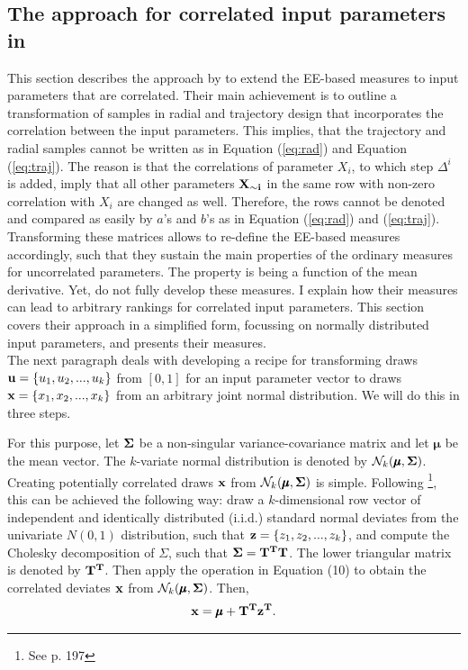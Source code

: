 \subsection{The approach for correlated input parameters in \cite{ge2017extending}}

This section describes the approach by \cite{ge2017extending} to extend the EE-based measures to input parameters that are correlated. Their main achievement is to outline a transformation of samples in radial and trajectory design that incorporates the correlation between the input parameters. This implies, that the trajectory and radial samples cannot be written as in Equation (\ref{eq:rad}) and Equation (\ref{eq:traj}). The reason is that the correlations of parameter $X_i$, to which step $\Delta^i$ is added, imply that all other parameters $\bold{X_{\sim i}}$ in the same row with non-zero correlation with $X_i$ are changed as well. Therefore, the rows cannot be denoted and compared as easily by $a$'s and $b$'s as in Equation (\ref{eq:rad}) and (\ref{eq:traj}). Transforming these matrices allows to re-define the EE-based measures accordingly, such that they sustain the main properties of the ordinary measures for uncorrelated parameters. The property is being a function of the mean derivative. Yet, \cite{ge2017extending} do not fully develop these measures. I explain how their measures can lead to arbitrary rankings for correlated input parameters. This section covers their approach in a simplified form, focussing on normally distributed input parameters, and presents their measures.\\

\noindent
The next paragraph deals with developing a recipe for transforming draws $\bold{u} = \{u_1, u_2, ..., u_k\}$ from $[0,1]$ for an input parameter vector to draws $\bold{x} = \{x_1, x_2, ..., x_k\}$ from an arbitrary joint normal distribution. We will do this in three steps. 

For this purpose, let $\bold{\Sigma}$ be a non-singular variance-covariance matrix and let $\pmb{\mu}$ be the mean vector. The $k$-variate normal distribution is denoted by $\mathcal{N}_k(\pmb{\mu}, \bold{\Sigma})$. \\

\noindent
Creating potentially correlated draws $\bold{x}$ from $\mathcal{N}_k(\pmb{\mu}, \bold{\Sigma})$ is simple. Following \cite{gentle2006random}\footnote{See p. 197}, this can be achieved the following way: draw a $k$-dimensional row vector of independent and identically distributed (i.i.d.) standard normal deviates from the univariate $N(0,1)$ distribution, such that  $\bold{z} = \{z_1, z_2, ..., z_k\}$, and compute the Cholesky decomposition of $\Sigma$, such that $\bold{\Sigma} = \bold{T^T T}$. The lower triangular matrix is denoted by $\bold{T^T}$. Then apply the operation in Equation (10) to obtain the correlated deviates $\bold{x}$ from $\mathcal{N}_k(\pmb{\mu}, \bold{\Sigma})$. Then,
\begin{align}
\bold{x} = \pmb{\mu} + \bold{T^T z^T}.
\end{align}

